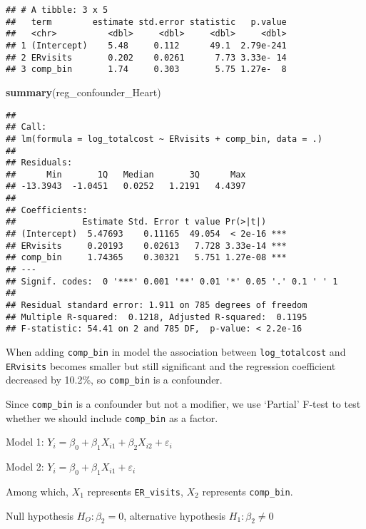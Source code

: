 \documentclass[]{article}
\newenvironment{Shaded}{\begin{snugshade}}{\end{snugshade}}
\newcommand{\KeywordTok}[1]{\textcolor[rgb]{0.13,0.29,0.53}{\textbf{#1}}}
\newcommand{\StringTok}[1]{\textcolor[rgb]{0.31,0.60,0.02}{#1}}
\newcommand{\OperatorTok}[1]{\textcolor[rgb]{0.81,0.36,0.00}{\textbf{#1}}}
\newcommand{\NormalTok}[1]{#1}
\begin{document}
\begin{verbatim}
## # A tibble: 3 x 5
##   term        estimate std.error statistic   p.value
##   <chr>          <dbl>     <dbl>     <dbl>     <dbl>
## 1 (Intercept)    5.48     0.112      49.1  2.79e-241
## 2 ERvisits       0.202    0.0261      7.73 3.33e- 14
## 3 comp_bin       1.74     0.303       5.75 1.27e-  8
\end{verbatim}

\begin{Shaded}
\begin{Highlighting}[]
\KeywordTok{summary}\NormalTok{(reg_confounder_Heart)}
\end{Highlighting}
\end{Shaded}

\begin{verbatim}
## 
## Call:
## lm(formula = log_totalcost ~ ERvisits + comp_bin, data = .)
## 
## Residuals:
##      Min       1Q   Median       3Q      Max 
## -13.3943  -1.0451   0.0252   1.2191   4.4397 
## 
## Coefficients:
##             Estimate Std. Error t value Pr(>|t|)    
## (Intercept)  5.47693    0.11165  49.054  < 2e-16 ***
## ERvisits     0.20193    0.02613   7.728 3.33e-14 ***
## comp_bin     1.74365    0.30321   5.751 1.27e-08 ***
## ---
## Signif. codes:  0 '***' 0.001 '**' 0.01 '*' 0.05 '.' 0.1 ' ' 1
## 
## Residual standard error: 1.911 on 785 degrees of freedom
## Multiple R-squared:  0.1218, Adjusted R-squared:  0.1195 
## F-statistic: 54.41 on 2 and 785 DF,  p-value: < 2.2e-16
\end{verbatim}

When adding \texttt{comp\_bin} in model the association between
\texttt{log\_totalcost} and \texttt{ERvisits} becomes smaller but still
significant and the regression coefficient decreased by 10.2\%, so
\texttt{comp\_bin} is a confounder.

Since \texttt{comp\_bin} is a confounder but not a modifier, we use
`Partial' F-test to test whether we should include \texttt{comp\_bin} as
a factor.

Model 1:
\(Y_i = \beta_0 + \beta_1X_{i1} + \beta_2X_{i2} + \varepsilon_i\)

Model 2: \(Y_i = \beta_0 + \beta_1X_{i1} + \varepsilon_i\)

Among which, \(X_1\) represents \texttt{ER\_visits}, \(X_2\) represents
\texttt{comp\_bin}.

Null hypothesis \(H_O: \beta_2 = 0\), alternative hypothesis
\(H_1: \beta_2 \neq 0\)

\begin{Shaded}
\end{Shaded}
\end{document}
